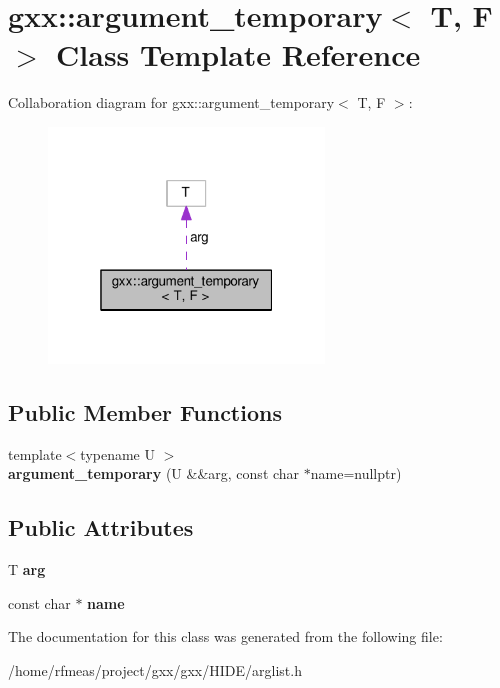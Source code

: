 \hypertarget{classgxx_1_1argument__temporary}{}\section{gxx\+:\+:argument\+\_\+temporary$<$ T, F $>$ Class Template Reference}
\label{classgxx_1_1argument__temporary}


Collaboration diagram for gxx\+:\+:argument\+\_\+temporary$<$ T, F $>$\+:
\nopagebreak
\begin{figure}[H]
\begin{center}
\leavevmode
\includegraphics[width=208pt]{classgxx_1_1argument__temporary__coll__graph}
\end{center}
\end{figure}
\subsection*{Public Member Functions}
\begin{DoxyCompactItemize}
\item 
{\footnotesize template$<$typename U $>$ }\\{\bfseries argument\+\_\+temporary} (U \&\&arg, const char $\ast$name=nullptr)\hypertarget{classgxx_1_1argument__temporary_aac80deb9dda0d1a0201ed763154a7c91}{}\label{classgxx_1_1argument__temporary_aac80deb9dda0d1a0201ed763154a7c91}

\end{DoxyCompactItemize}
\subsection*{Public Attributes}
\begin{DoxyCompactItemize}
\item 
T {\bfseries arg}\hypertarget{classgxx_1_1argument__temporary_a529739c9d72fe83137a89257e8259bed}{}\label{classgxx_1_1argument__temporary_a529739c9d72fe83137a89257e8259bed}

\item 
const char $\ast$ {\bfseries name}\hypertarget{classgxx_1_1argument__temporary_a4ec886fb49488055c1a4a6c8aaf6e982}{}\label{classgxx_1_1argument__temporary_a4ec886fb49488055c1a4a6c8aaf6e982}

\end{DoxyCompactItemize}


The documentation for this class was generated from the following file\+:\begin{DoxyCompactItemize}
\item 
/home/rfmeas/project/gxx/gxx/\+H\+I\+D\+E/arglist.\+h\end{DoxyCompactItemize}

